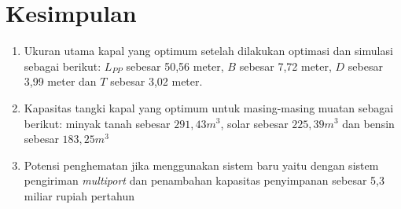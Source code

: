 \section{Kesimpulan}
\label{sec:kesimpulan}

\begin{enumerate}
    \item Ukuran utama kapal yang optimum setelah dilakukan optimasi dan simulasi sebagai berikut: $L_{PP}$ sebesar 50,56 meter, $B$ sebesar 7,72 meter, $D$ sebesar 3,99 meter dan $T$ sebesar 3,02 meter.
    \item Kapasitas tangki kapal yang optimum untuk masing-masing muatan sebagai berikut: minyak tanah sebesar $291,43 m^3$, solar sebesar $225,39 m^3$ dan bensin sebesar $183,25 m^3$
    \item Potensi penghematan jika menggunakan sistem baru yaitu dengan sistem pengiriman \emph{multiport} dan penambahan kapasitas penyimpanan sebesar 5,3 miliar rupiah pertahun
\end{enumerate}
